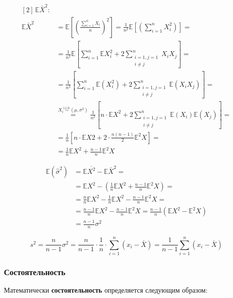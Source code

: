\documentclass[
  letterpaper,
]{scrbook}
\newcommand{\lp}{\left(}
\newcommand{\rp}{\right)}
\newcommand{\lb}{\left[}
\newcommand{\rb}{\right]}
\newcommand{\expect}{\mathbb{E}}
\newcommand{\iid}{\text{i.i.d.}}
\theoremstyle{definition}
\theoremstyle{remark}
\begin{document}
\[
\begin{split}
[2] \, \expect \bar X^2 : & \\
\expect \bar X^2 & = 
\expect \lb 
    \lp \frac{\sum_{i=1}^n X_i}{n} \rp ^2 
  \rb = 
\frac{1}{n^2} 
\expect \lb 
    \lp \sum_{i=1}^n X_i^2 \rp 
  \rb = \\
& = \frac{1}{n^2} \expect \lb 
    \sum_{i=1}^n \expect X_i^2 + 
    2 \sum_{
      \substack{i=1, j=1 \\ i \neq j}
      }^n X_i X_j 
    \rb = \\
& = \frac{1}{n^2} \lb
      \sum_{i=1}^n \expect (X_i^2) + 
      2 \sum_{
        \substack{i=1, j=1 \\ i \neq j}
      }^n \expect (X_i X_j)
    \rb = \\
& \overset{X_i \overset{\iid}{\sim} (\mu, \sigma^2)}{=} \frac{1}{n^2} \lb 
    n \cdot \expect X^2 + 
    2 \sum_{
      \substack{i=1, j=1 \\ i \neq j}
    }^n \expect (X_i) \expect (X_j) \rb = \\
& = \frac{1}{n} \lb n \cdot \expect X2 + 2 \cdot \frac{n(n-1)}{2} \expect^2 X \rb  = \\
& = \frac{1}{n} \expect X^2 + \frac{n-1}{n} \expect^2 X
\end{split}
\]

\[
\begin{split}
\expect (\hat \sigma^2) 
& = \expect \overline{X^2} - \expect \bar X^2 = \\
& = \expect X^2 - \lp \frac{1}{n} \expect X^2 + \frac{n-1}{n} \expect^2 X \rp = \\
& = \frac{n}{n} \expect X^2 - \frac{1}{n} \expect X^2 - \frac{n-1}{n} \expect^2 X = \\
& = \frac{n-1}{n} \expect X^2 - \frac{n-1}{n} \expect^2 X = \frac{n-1}{n} \lp \expect X^2 - \expect ^2 X \rp \\ 
& = \frac{n-1}{n} \sigma^2
\end{split}
\]

\[
s^2 = \frac{n}{n-1} \sigma^2 = \frac{n}{n-1} \cdot \frac{1}{n} \cdot \sum_{i=1}^n (x_i - \bar X) = \frac{1}{n-1} \sum_{i=1}^n (x_i - \bar X)
\]

\subsubsection{Состоятельность}\label{ux441ux43eux441ux442ux43eux44fux442ux435ux43bux44cux43dux43eux441ux442ux44c}

Математически \textbf{состоятельность} определяется следующим образом:
\end{document}
